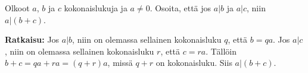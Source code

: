 \begin{esimerkki}
Olkoot $a$, $b$ ja $c$ kokonaislukuja ja $a\neq 0$. Osoita, että jos $a|b$ ja $a|c$, niin $a|(b + c)$.

{\bf Ratkaisu:}
Jos $a|b$, niin on olemassa sellainen kokonaisluku $q$, että $b = qa$.
Jos $a|c$, niin on olemassa sellainen kokonaisluku $r$, että $c = ra$.
Tällöin $b + c = qa + ra = (q + r)a$, missä $q + r$ on kokonaisluku. 
Siis $a|(b + c)$.
\end{esimerkki}



\Harjoitustehtavat

